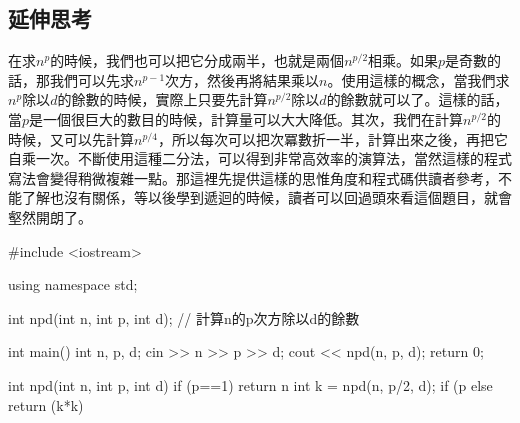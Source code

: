 \subsection{延伸思考}
在求$n^p$的時候，我們也可以把它分成兩半，也就是兩個$n^{p/2}$相乘。如果$p$是奇數的話，那我們可以先求$n^{p-1}$次方，然後再將結果乘以$n$。使用這樣的概念，當我們求$n^p$除以$d$的餘數的時候，實際上只要先計算$n^{p/2}$除以$d$的餘數就可以了。這樣的話，當$p$是一個很巨大的數目的時候，計算量可以大大降低。其次，我們在計算$n^{p/2}$的時候，又可以先計算$n^{p/4}$，所以每次可以把次冪數折一半，計算出來之後，再把它自乘一次。不斷使用這種二分法，可以得到非常高效率的演算法，當然這樣的程式寫法會變得稍微複雜一點。那這裡先提供這樣的思惟角度和程式碼供讀者參考，不能了解也沒有關係，等以後學到遞迴的時候，讀者可以回過頭來看這個題目，就會壑然開朗了。
\begin{cppcode}
	#include <iostream>
	
	using namespace std;
	
	int npd(int n, int p, int d); // 計算n的p次方除以d的餘數
	
	int main()
	{
		int n, p, d;
		cin >> n >> p >> d;
		cout << npd(n, p, d);
		return 0;
	}
	
	int npd(int n, int p, int d)
	{
		if (p==1) return n %
		int k = npd(n, p/2, d);
		if (p%
		else return (k*k) %
	}
\end{cppcode}

